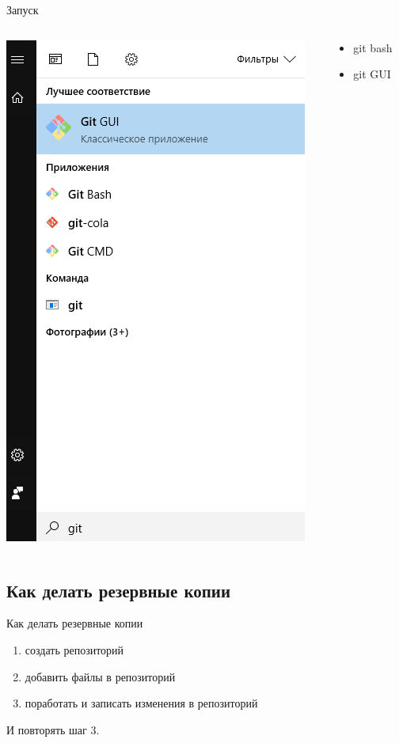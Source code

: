 \documentclass[presentation]{beamer}
\begin{document}
\begin{frame}[label={sec:orge031c65}]{Запуск}
\begin{columns}
\begin{column}{0.45\columnwidth}
\begin{center}
\includegraphics[height=0.8\textheight]{./01_vcs_01_find_git.PNG}
\end{center}
\end{column}
\begin{column}{0.45\columnwidth}
\begin{itemize}
\item git bash
\item git GUI
\end{itemize}
\end{column}
\end{columns}
\end{frame}

\subsection{Как делать резервные копии}
\label{sec:org4b71334}
\begin{frame}[label={sec:orgc7ccede}]{Как делать резервные копии}
\begin{enumerate}
\item создать репозиторий
\item добавить файлы в репозиторий
\item поработать и записать изменения в репозиторий
\end{enumerate}

И повторять шаг 3.
\end{frame}
\end{document}
